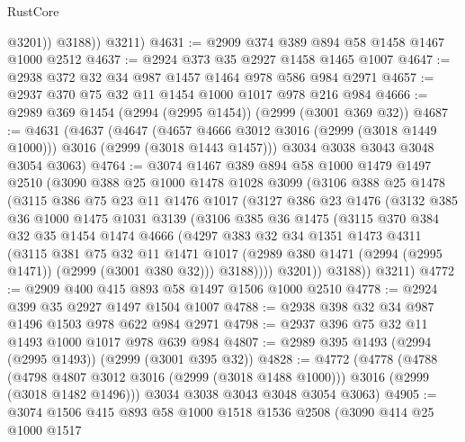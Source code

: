 \begin{lexlean}{RustCore}
\begin{coremodule}
              @3201))
          @3188))
      @3211)
@4631 := @2909 @374 @389 @894 @58 @1458 @1467 @1000 @2512
@4637 := @2924 @373 @35 @2927 @1458 @1465 @1007
@4647 := @2938 @372 @32 @34 @987 @1457 @1464 @978 @586 @984 @2971
@4657 := @2937 @370 @75 @32 @11 @1454 @1000 @1017 @978 @216 @984
@4666 := @2989 @369 @1454 (@2994 (@2995 @1454)) (@2999 (@3001 @369 @32))
@4687 := @4631
    (@4637
      (@4647
        (@4657 @4666 @3012 @3016 (@2999 (@3018 @1449 @1000)))
        @3016
        (@2999 (@3018 @1443 @1457)))
      @3034
      @3038
      @3043
      @3048
      @3054
      @3063)
@4764 := @3074
    @1467
    @389
    @894
    @58
    @1000
    @1479
    @1497
    @2510
    (@3090
      @388
      @25
      @1000
      @1478
      @1028
      @3099
      (@3106
        @388
        @25
        @1478
        (@3115
          @386
          @75
          @23
          @11
          @1476
          @1017
          (@3127
            @386
            @23
            @1476
            (@3132
              @385
              @36
              @1000
              @1475
              @1031
              @3139
              (@3106
                @385
                @36
                @1475
                (@3115
                  @370
                  @384
                  @32
                  @35
                  @1454
                  @1474
                  @4666
                  (@4297
                    @383
                    @32
                    @34
                    @1351
                    @1473
                    @4311
                    (@3115
                      @381
                      @75
                      @32
                      @11
                      @1471
                      @1017
                      (@2989 @380 @1471 (@2994 (@2995 @1471)) (@2999 (@3001 @380 @32)))
                      @3188))))
              @3201))
          @3188))
      @3211)
@4772 := @2909 @400 @415 @893 @58 @1497 @1506 @1000 @2510
@4778 := @2924 @399 @35 @2927 @1497 @1504 @1007
@4788 := @2938 @398 @32 @34 @987 @1496 @1503 @978 @622 @984 @2971
@4798 := @2937 @396 @75 @32 @11 @1493 @1000 @1017 @978 @639 @984
@4807 := @2989 @395 @1493 (@2994 (@2995 @1493)) (@2999 (@3001 @395 @32))
@4828 := @4772
    (@4778
      (@4788
        (@4798 @4807 @3012 @3016 (@2999 (@3018 @1488 @1000)))
        @3016
        (@2999 (@3018 @1482 @1496)))
      @3034
      @3038
      @3043
      @3048
      @3054
      @3063)
@4905 := @3074
    @1506
    @415
    @893
    @58
    @1000
    @1518
    @1536
    @2508
    (@3090
      @414
      @25
      @1000
      @1517

\end{coremodule}
\end{lexlean}
